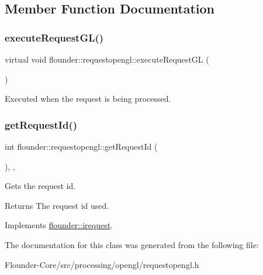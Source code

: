 \subsection{Member Function Documentation}
\mbox{\label{classflounder_1_1requestopengl_abc16ac9157ca6f6ebd3a556469ad5d51}} 
\subsubsection{\texorpdfstring{execute\+Request\+G\+L()}{executeRequestGL()}}
{\footnotesize\ttfamily virtual void flounder\+::requestopengl\+::execute\+Request\+GL (\begin{DoxyParamCaption}{ }\end{DoxyParamCaption})\hspace{0.3cm}{\ttfamily [pure virtual]}}



Executed when the request is being processed. 

\mbox{\label{classflounder_1_1requestopengl_a897fbd9310873f5a2972764b5d855409}} 
\subsubsection{\texorpdfstring{get\+Request\+Id()}{getRequestId()}}
{\footnotesize\ttfamily int flounder\+::requestopengl\+::get\+Request\+Id (\begin{DoxyParamCaption}{ }\end{DoxyParamCaption})\hspace{0.3cm}{\ttfamily [inline]}, {\ttfamily [override]}, {\ttfamily [virtual]}}



Gets the request id. 

\begin{DoxyReturn}{Returns}
The request id used. 
\end{DoxyReturn}


Implements \hyperlink{classflounder_1_1irequest_a69e6b820c6635486e488e6aa18b11730}{flounder\+::irequest}.



The documentation for this class was generated from the following file\+:\begin{DoxyCompactItemize}
\item 
Flounder-\/\+Core/src/processing/opengl/requestopengl.\+h\end{DoxyCompactItemize}
